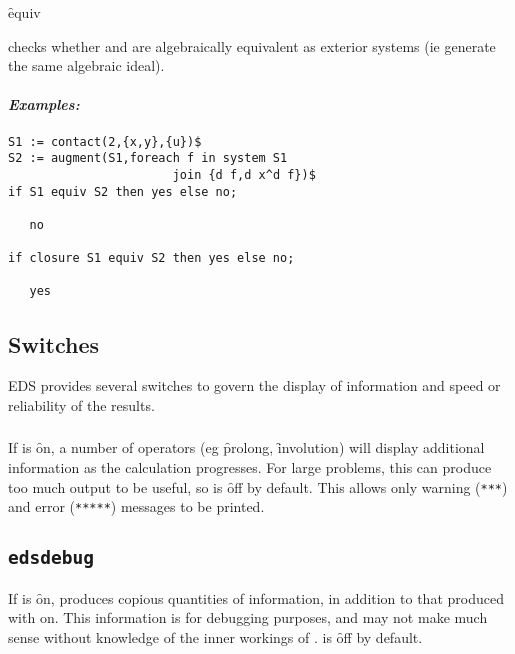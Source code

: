 \hypertarget{operator:EDS_EQUIV}{}
\begin{syntax}
	 \f{equiv} 
\end{syntax}
checks whether  and  are algebraically equivalent as
exterior systems (ie generate the same algebraic ideal).

\paragraph{\textit{Examples:}}
\begin{verbatim}
S1 := contact(2,{x,y},{u})$
S2 := augment(S1,foreach f in system S1
                       join {d f,d x^d f})$
if S1 equiv S2 then yes else no;

   no

if closure S1 equiv S2 then yes else no;

   yes
\end{verbatim}




\subsection{Switches}
\label{Switches}

EDS provides several switches to govern the display of information and
speed or reliability of the results.

\subsubsection{}
\label{edsverbose}

If  is \f{on}, a number of operators (eg \f{prolong},
\f{involution}) will display additional information as the calculation
progresses. For large problems, this can produce too much output to be
useful, so  is \f{off} by default. This allows only warning
(\texttt{***}) and error (\texttt{*****}) messages to be printed.

\subsection{{\texttt{edsdebug}}}
\label{edsdebug}

If  is \f{on},  produces copious quantities of information,
in addition to that produced with  on. This information is
for debugging purposes, and may not make much sense without knowledge of
the inner workings of .  is \f{off} by default.

